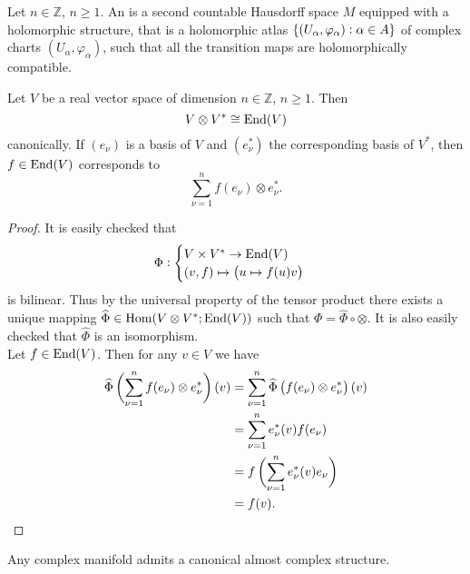 \begin{definition}
Let $n \in \mathbb{Z}$, $n \geq 1$. An  is a second countable Hausdorff space $M$ equipped with a holomorphic structure, that is a holomorphic atlas $\cbr[0]{(U_\alpha, \varphi_\alpha) : \alpha \in A}$ of complex charts $(U_\alpha,\varphi_\alpha)$, such that all the transition maps are holomorphically compatible.
\end{definition}

\begin{lemma}
Let $V$ be a real vector space of dimension $n \in \mathbb{Z}$, $n \geq 1$. Then
\begin{equation}
V \otimes V^* \cong \operatorname{End}(V)
\end{equation}
\noindent canonically. If $(e_\nu)$ is a basis of $V$ and $(e_\nu^*)$ the corresponding basis of $V^*$, then $f \in \operatorname{End}(V)$ corresponds to
\begin{equation}
\sum_{\nu = 1}^n f(e_\nu) \otimes e_\nu^*.
\end{equation}
\label{lem:corr}
\end{lemma}

\begin{proof}
It is easily checked that
\begin{equation*}
\Phi:\begin{cases} 
V \times V^* \to \End(V)\\
(v,f) \mapsto \del[1]{u \mapsto f(u)v}
\end{cases}
\end{equation*}
\noindent is bilinear. Thus by the universal property of the tensor product there exists a unique mapping $\widehat{\Phi} \in \operatorname{Hom}(V \otimes V^*; \operatorname{End}(V))$ such that $\Phi = \widehat{\Phi} \circ \otimes$. It is also easily checked that $\widehat{\Phi}$ is an isomorphism.\\
Let $f \in \operatorname{End}(V)$. Then for any $v \in V$ we have
\begin{align*}
\widehat{\Phi}\del[3]{\sum_{\nu = 1}^n f(e_\nu) \otimes e_\nu^*}(v) &= \sum_{\nu = 1}^n \widehat{\Phi}\del[1]{f(e_\nu) \otimes e_\nu^*}(v)\\
&= \sum_{\nu = 1}^n e_\nu^*(v)f(e_\nu)\\
&= f\del[3]{\sum_{\nu = 1}^n e_\nu^*(v)e_\nu}\\
&= f(v).
\end{align*}
\end{proof}

\begin{proposition}
Any complex manifold admits a canonical almost complex structure.
\end{proposition}

